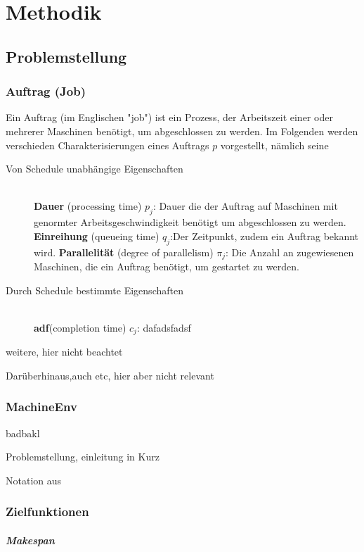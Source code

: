 \chapter{Methodik}
\label{chap:ein}

\section{Problemstellung}

\subsection{Auftrag (Job)}
Ein Auftrag (im Englischen "job") ist ein Prozess, der Arbeitszeit einer oder mehrerer Maschinen benötigt, um abgeschlossen zu werden. Im Folgenden werden verschieden Charakterisierungen eines Auftrags $p$ vorgestellt, nämlich seine

\begin{description}
	\item[Von Schedule unabhängige Eigenschaften] \hfil \\
\textbf{Dauer} (processing time) $p_j$: Dauer die der Auftrag auf Maschinen mit genormter Arbeitsgeschwindigkeit benötigt um abgeschlossen zu werden.
\textbf{Einreihung} (queueing time) $q_j$:Der Zeitpunkt, zudem ein Auftrag bekannt wird.
\textbf{Parallelität} (degree of parallelism) $\pi_j$: Die Anzahl an zugewiesenen Maschinen, die ein Auftrag benötigt, um gestartet zu werden.
\item[Durch Schedule bestimmte Eigenschaften]\hfill \\ 
\textbf{adf}(completion time) $c_j$: dafadsfadsf
\item[weitere, hier nicht beachtet]
\end{description}
Darüberhinaus,auch etc, hier aber nicht relevant


\subsection{MachineEnv}
badbakl

Problemstellung, einleitung in Kurz

Notation aus

\subsection{Zielfunktionen}

\paragraph{Makespan}

